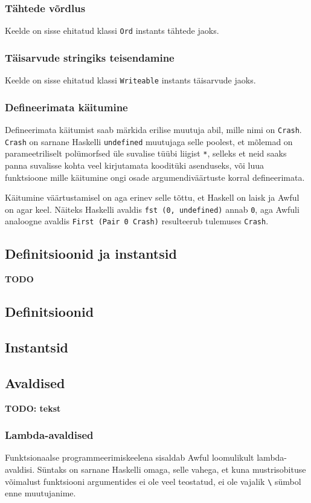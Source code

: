 \documentclass[12pt]{article}
\newcommand\markus[1]{\textcolor{roheline}{\textbf{#1}}}
\begin{document}
      \subsubsection{Tähtede võrdlus}
        Keelde on sisse ehitatud klassi \verb!Ord! instants tähtede jaoks.
      \subsubsection{Täisarvude stringiks teisendamine}
        Keelde on sisse ehitatud klassi \verb!Writeable! instants täisarvude jaoks.
      \subsubsection{Defineerimata käitumine}
        Defineerimata käitumist saab märkida erilise muutuja abil, mille nimi on \verb!Crash!. \verb!Crash! on sarnane Haskelli \verb!undefined! muutujaga selle poolest, et mõlemad on parameetriliselt polümorfsed üle suvalise tüübi liigist \verb!*!, selleks et neid saaks panna suvalisse kohta veel kirjutamata kooditüki asenduseks, või luua funktsioone mille käitumine ongi osade argumendiväärtuste korral defineerimata.

        Käitumine väärtustamisel on aga erinev selle tõttu, et Haskell on laisk ja Awful on agar keel. Näiteks Haskelli avaldis \verb!fst (0, undefined)! annab \verb!0!, aga Awfuli analoogne avaldis \verb!First (Pair 0 Crash)! resulteerub tulemuses \verb!Crash!.
    \subsection{Definitsioonid ja instantsid}
      \markus{TODO}
      \subsection{Definitsioonid}
        
      \subsection{Instantsid}
        
    \subsection{Avaldised}
      \markus{TODO: tekst}
      \subsubsection{Lambda-avaldised}
        Funktsionaalse programmeerimiskeelena sisaldab Awful loomulikult lambda-avaldisi. Süntaks on sarnane Haskelli omaga, selle vahega, et kuna mustrisobituse võimalust funktsiooni argumentides ei ole veel teostatud, ei ole vajalik \verb!\! sümbol enne muutujanime.
\end{document}
